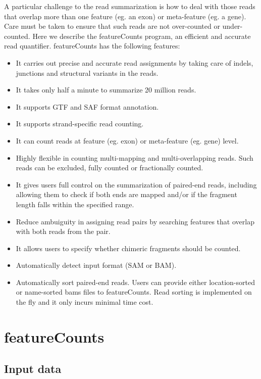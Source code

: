 \documentclass[12pt]{report}
\newcommand{\featureCounts}{\textsf{featureCounts}}
\begin{document}
A particular challenge to the read summarization is how to deal with those reads that overlap more than one feature (eg. an exon) or meta-feature (eg. a gene).
Care must be taken to ensure that such reads are not over-counted or under-counted.
Here we describe the {\featureCounts} program, an efficient and accurate read quantifier.
{\featureCounts} has the following features:
\begin{itemize}
\item It carries out precise and accurate read assignments by taking care of indels, junctions and structural variants in the reads.
\item It takes only half a minute to summarize 20 million reads.
\item It supports GTF and SAF format annotation.
\item It supports strand-specific read counting.
\item It can count reads at feature (eg. exon) or meta-feature (eg. gene) level.
\item Highly flexible in counting multi-mapping and multi-overlapping reads. Such reads can be excluded, fully counted or fractionally counted.
\item It gives users full control on the summarization of paired-end reads, including allowing them to check if both ends are mapped and/or if the fragment length falls within the specified range.
\item Reduce ambuiguity in assigning read pairs by searching features that overlap with both reads from the pair.
\item It allows users to specify whether chimeric fragments should be counted.
\item Automatically detect input format (SAM or BAM).
\item Automatically sort paired-end reads. Users can provide either location-sorted or name-sorted bams files to featureCounts. Read sorting is implemented on the fly and it only incurs minimal time cost.
\end{itemize}

\section{featureCounts}
\label{sec:featureCounts}

\subsection{Input data}
\end{document}
